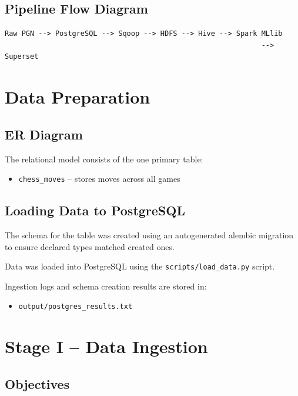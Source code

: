 \documentclass[12pt,a4paper]{article}
\begin{document}
\subsection{Pipeline Flow Diagram}

\begin{verbatim}
Raw PGN --> PostgreSQL --> Sqoop --> HDFS --> Hive --> Spark MLlib
                                                             --> Superset
\end{verbatim}

\section{Data Preparation}

\subsection{ER Diagram}

The relational model consists of the one primary table:

\begin{itemize}
    \item \texttt{chess\_moves} -- stores moves across all games
\end{itemize}

\subsection{Loading Data to PostgreSQL}

The schema for the table was created using an autogenerated alembic migration to ensure declared types matched created ones.

Data was loaded into PostgreSQL using the \texttt{scripts/load\_data.py} script.

Ingestion logs and schema creation results are stored in:

\begin{itemize}
    \item \texttt{output/postgres\_results.txt}
\end{itemize}

\section{Stage I -- Data Ingestion}

\subsection{Objectives}
\end{document}
